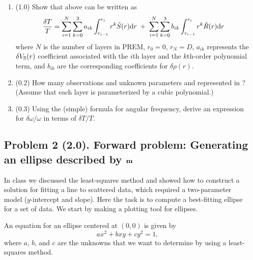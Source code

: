 \documentclass[11pt,titlepage,fleqn]{article}
\begin{document}
\begin{enumerate}
\begin{enumerate}
\item (1.0) Show that  above can be written as
%
\begin{equation}
\frac{\delta T}{T} = \sum_{i=1}^N \sum_{k=0}^3 a_{ik} \int_{r_{i-1}}^{r_i} r^{k} \tilde{S}(r) \mathrm{d} r
\;+\; \sum_{i=1}^N \sum_{k=0}^3 b_{ik} \int_{r_{i-1}}^{r_i} r^{k} \tilde{R}(r) \mathrm{d} r
\label{dT2}
\end{equation}
%
where $N$ is the number of layers in PREM, $r_0 = 0$, $r_N = D$, $a_{ik}$ represents the $\delta V_{\rm S}(r)$ coefficient associated with the $i$th layer and the $k$th-order polynomial term, and $b_{ik}$ are the corresponding coefficients for $\delta\rho(r)$.

\item (0.2) How many observations and unknown parameters and represented in ? (Assume that each layer is parameterized by a cubic polynomial.)

\item (0.3) Using the (simple) formula for angular frequency, derive an expression for $\delta\omega/\omega$ in terms of $\delta T/T$.

\end{enumerate}

\end{enumerate}


\subsection*{Problem 2 (2.0). Forward problem: Generating an ellipse described by $\mbox{${\bf m}$}$}

In class we discussed the least-squares method and showed how to construct a solution for fitting a line to scattered data, which required a  two-parameter model ($y$-intercept and slope). Here the task is to compute a best-fitting ellipse for a set of data. We start by making a plotting tool for ellipses.

An equation for an ellipse centered at $(0,0)$ is given by
%
\begin{equation}
ax^2 + bxy + cy^2 = 1,
\label{ellipse}
\end{equation}
%
where $a$, $b$, and $c$ are the unknowns that we want to determine by using a least-squares method.
\end{document}
